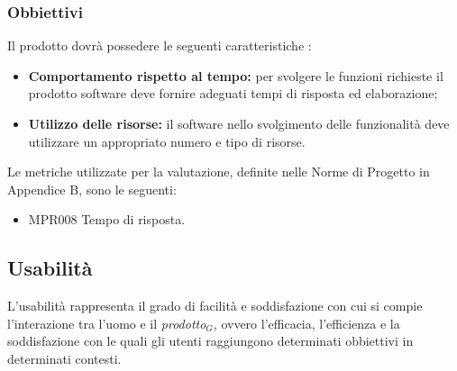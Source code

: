 \subsubsection{Obbiettivi } Il prodotto dovrà possedere le seguenti caratteristiche :
\begin{itemize}
	\item \textbf{Comportamento rispetto al tempo:} per svolgere le  funzioni richieste il prodotto software deve fornire adeguati tempi di risposta ed elaborazione;
	\item \textbf{Utilizzo delle risorse:} il software nello svolgimento delle funzionalità deve utilizzare un appropriato numero e tipo di risorse.
\end{itemize}
Le metriche utilizzate per la valutazione, definite nelle Norme di Progetto in Appendice B, sono le seguenti:
\begin{itemize}
	\item MPR008 Tempo di risposta.
\end{itemize}

\subsection{Usabilità}
L'usabilità rappresenta il grado di facilità e soddisfazione con cui si compie l'interazione tra l'uomo e il \textit{prodotto$_{G}$}, ovvero l'efficacia, l'efficienza e la soddisfazione con le quali gli utenti raggiungono determinati obbiettivi in determinati contesti.
